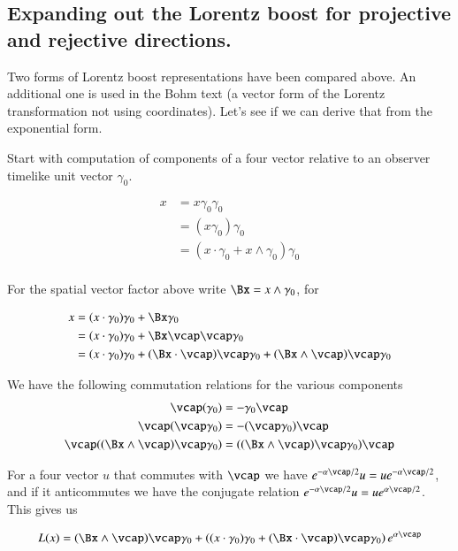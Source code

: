 \subsection{Expanding out the Lorentz boost for projective and rejective directions. }

Two forms of Lorentz boost representations have been compared above.  An additional one is used in the Bohm text (a 
vector form of the Lorentz transformation not using coordinates).  Let's see
if we can derive that from the exponential form.

Start with computation of components of a four vector relative to an observer timelike unit vector $\gamma_0$.

\begin{align*}
x 
&= x \gamma_0 \gamma_0 \\
&= (x \gamma_0) \gamma_0 \\
&= (x \cdot \gamma_0 + x \wedge \gamma_0) \gamma_0 \\
\end{align*}

For the spatial vector factor above write $\Bx = x \wedge \gamma_0$, for

\begin{align*}
x 
&= (x \cdot \gamma_0) \gamma_0 + \Bx \gamma_0 \\
&= (x \cdot \gamma_0) \gamma_0 + \Bx \vcap \vcap \gamma_0 \\
&= (x \cdot \gamma_0) \gamma_0 + (\Bx \cdot \vcap) \vcap \gamma_0 + (\Bx \wedge \vcap) \vcap \gamma_0 \\
\end{align*}

We have the following commutation relations for the various components
\begin{align*}
\vcap (\gamma_0) &= - \gamma_0 \vcap \\
\vcap (\vcap \gamma_0) &= - (\vcap \gamma_0) \vcap \\
\vcap ((\Bx \wedge \vcap) \vcap \gamma_0 ) 
&= ((\Bx \wedge \vcap) \vcap \gamma_0) \vcap
\end{align*}

For a four vector $u$ that commutes with $\vcap$ we have $e^{-\alpha \vcap/2} u = u e^{-\alpha \vcap/2}$, and if it anticommutes
we have the conjugate relation
$e^{-\alpha \vcap/2} u = u e^{\alpha \vcap/2}$.  This gives us

\begin{align*}
L(x) 
&= 
(\Bx \wedge \vcap) \vcap \gamma_0 +
\left( (x \cdot \gamma_0) \gamma_0 + (\Bx \cdot \vcap) \vcap \gamma_0 \right) e^{\alpha \vcap} \\
\end{align*}


